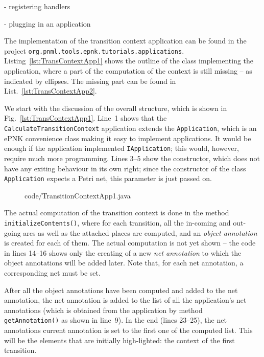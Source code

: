 - registering handlers

- plugging in an application


The implementation of the transition context application can be found
in the project {\tt org.pnml.tools.epnk.tutorials.applications}.
Listing~\ref{lst:TransContextApp1} shows the outline of the class implementing
the application, where a part of the computation of the context is still missing
-- as indicated by ellipses. The missing part can be found in
List.~\ref{lst:TransContextApp2}.

We start with the discussion of the overall structure, which is shown in
Fig.~\ref{lst:TransContextApp1}. Line~1 shows that the {\tt CalculateTransitionContext}
application extends the {\tt Application}, which is an ePNK convenience class
making it easy to implement applications. It would be enough if the application
implemented {\tt IApplication}; this would, however, require much more programming.
Lines 3--5 show the constructor, which does not have any exiting behaviour in
its own right; since the constructor of the class {\tt Application} expects a
Petri net, this parameter is just passed on.

\begin{figure}[htbp!]
%
  {code/TransitionContextApp1.java}
\end{figure}

%
%
The actual computation of the transition context is done in the method
{\tt initializeContents()}, where for each transition, all the in-coming
and out-going arcs as well as the attached places are computed, and
an \emph{object annotation} is created for each of them. The actual computation
is not yet shown -- the code in lines 14--16 shows only the creating of a 
new \emph{net annotation} to which the object annotations will be added later.
Note that, for each net annotation, a corresponding net must be set. 

After all the object annotations have been computed and added to the net
annotation, the net annotation is added to the list of all the application's net
annotations (which is obtained from the application by method {\tt
getAnnotation()} as shown in line~9). In the end (lines 23--25), the net
annotations current annotation is set to the first one of the computed list.
This will be the elements that are initially high-lighted: the context of the
first transition.
 
